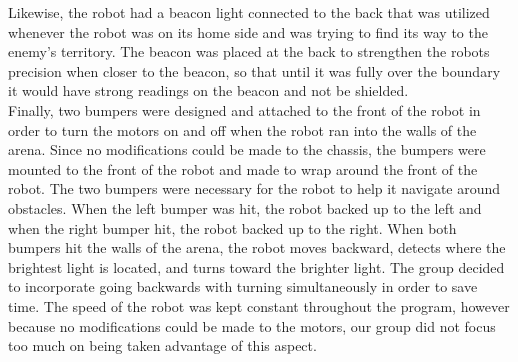 \documentclass{article}
\begin{document}
    Likewise, the robot had a beacon light connected to the back that was utilized whenever the robot was on its home side and was trying to find its way to the enemy’s territory. The beacon was placed at the back to strengthen the robots precision when closer to the beacon, so that until it was fully over the boundary it would have strong readings on the beacon and not be shielded. \\
    
	Finally, two bumpers were designed and attached to the front of the robot in order to turn the motors on and off when the robot ran into the walls of the arena. Since no modifications could be made to the chassis, the bumpers were mounted to the front of the robot and made to wrap around the front of the robot. The two bumpers were necessary for the robot to help it navigate around obstacles. When the left bumper was hit, the robot backed up to the left and when the right bumper hit, the robot backed up to the right. When both bumpers hit the walls of the arena, the robot moves backward, detects where the brightest light is located, and turns toward the brighter light. The group decided to incorporate going backwards with turning simultaneously in order to save time. The speed of the robot was kept constant throughout the program, however because no modifications could be made to the motors, our group did not focus too much on being taken advantage of this aspect.
\end{document}
